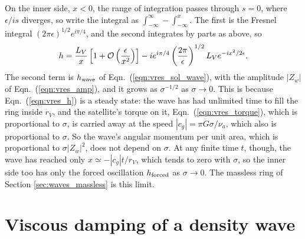 \documentclass[twocolumn]{aastex702}
\begin{document}
On the inner side, $x < 0$, the range of integration passes through $s = 0$, where $\epsilon/is$ diverges, so
write the integral as $\int_{-\infty}^\infty - \int_{-\infty}^x$. The first is the Fresnel integral
$(2\pi\epsilon)^{1/2}e^{i\pi/4}$, and the second integrates by parts as above, so
\begin{equation}
    \label{eqn:limit_inner}
    h = \frac{L_V}{x}\left[1 + {\cal O}\left(\frac{\epsilon}{x^2}\right)\right]
        - ie^{i\pi/4}\left(\frac{2\pi}{\epsilon}\right)^{1/2}L_Ve^{-ix^2/2\epsilon}.
\end{equation}
The second term is $h_{\rm wave}$ of Eqn.\ (\ref{eqn:vres_sol_wave}), with the amplitude $|Z_w|$ of
Eqn.\ (\ref{eqn:vres_amp}), and it grows as $\sigma^{-1/2}$ as $\sigma \rightarrow 0$. This is because
Eqn.\ (\ref{eqn:vres_h}) is a steady state: the wave has had unlimited time to fill the ring inside $r_V$,
and the satellite's torque on it, Eqn.\ (\ref{eqn:vres_torque}), which is proportional to $\sigma$, is carried
away at the speed $|c_g| = \pi G\sigma/\nu_a$, which also is proportional to $\sigma$. So the wave's
angular momentum per unit area, which is proportional to $\sigma|Z_w|^2$, does not depend on $\sigma$. At any finite time $t$, though, the wave
has reached only $x \simeq -|c_g|t/r_V$, which tends to zero with $\sigma$, so the inner side too has only
the forced oscillation $h_{\rm forced}$ as $\sigma \rightarrow 0$. The massless ring of
Section \ref{sec:waves_massless} is this limit.

\section{Viscous damping of a density wave}
\label{sec:appendix_viscous}
\setcounter{equation}{0}
\end{document}
